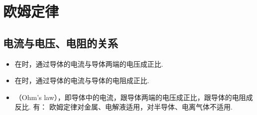 \section{欧姆定律}

\subsection{电流与电压、电阻的关系}
\begin{itemize}
\item 在时，通过导体的电流与导体两端的电压成正比.
\item 在时，通过导体的电流与导体的电阻成正比.
\item {}（Ohm's law），即导体中的电流，跟导体两端的电压成正比，跟导体的电阻成反比. 有：
\newline 欧姆定律对金属、电解液适用，对半导体、电离气体不适用.
\end{itemize}
